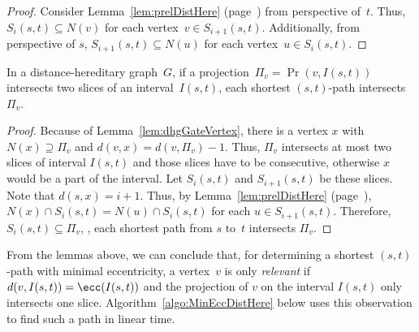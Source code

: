 \begin{proof}
Consider Lemma~\ref{lem:prelDistHere} (page~\pageref{lem:prelDistHere}) from perspective of~$t$.
Thus, $S_i(s,t) \subseteq N(v)$ for each vertex~$v \in S_{i+1}(s,t)$.
Additionally, from perspective of $s$, $S_{i+1}(s,t) \subseteq N(u)$ for each vertex~$u \in S_{i}(s,t)$.
\end{proof}

\begin{lemma}
    \label{lem:dhgProjSliceInter}
In a distance-hereditary graph~\( G \), if a projection~\( \Pi_v = \Pr(v, I(s, t)) \) intersects two slices of an interval~\( I(s, t) \), each shortest \( (s, t) \)-path intersects~\( \Pi_v \).
\end{lemma}

\begin{proof}
Because of Lemma~\ref{lem:dhgGateVertex}, there is a vertex $x$ with $N(x) \supseteq \Pi_v$ and $d(v,x) = d(v, \Pi_v) - 1$.
Thus, $\Pi_v$ intersects at most two slices of interval $I(s,t)$ and those slices have to be consecutive, otherwise $x$ would be a part of the interval.
Let $S_i(s,t)$ and $S_{i+1}(s,t)$ be these slices.
Note that $d(s, x) = i + 1$.
Thus, by Lemma~\ref{lem:prelDistHere} (page~\pageref{lem:prelDistHere}), $N(x) \cap S_i(s,t) = N(u) \cap S_i(s,t)$ for each $u \in S_{i+1}(s,t)$.
Therefore, $S_i(s,t) \subseteq \Pi_v$, \ie, each shortest path from $s$ to~$t$ intersects $\Pi_v$.
\end{proof}

From the lemmas above, we can conclude that, for determining a shortest $(s,t)$-path with minimal eccentricity, a vertex~$v$ is only \emph{relevant} if $d(v, I(s,t)) = \ecc(I(s,t))$ and the projection of $v$ on the interval $I(s,t)$ only intersects one slice.
Algorithm~\ref{algo:MinEccDistHere} below uses this observation to find  such a path in linear time.

